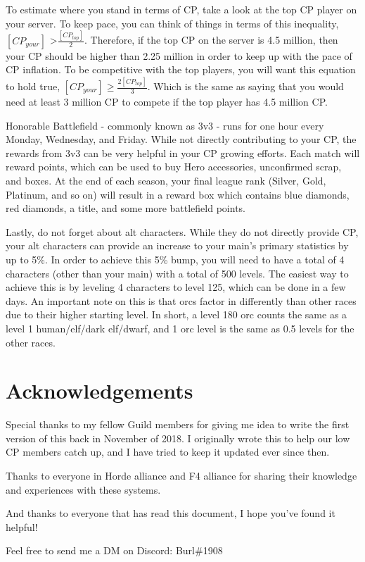 \documentclass[]{article}
\begin{document}
To estimate where you stand in terms of CP, take a look at the top CP player on your server.
To keep pace, you can think of things in terms of this inequality, $[CP_{your}]$ \textgreater $\frac{[CP_{top}]}{2}$. Therefore, if the top CP on the server is 4.5 million, then your CP should be higher than 2.25 million in order to keep up with the pace of CP inflation. To be competitive with the top players, you will want this equation to hold true, $[CP_{your}] \geq \frac{2[CP_{top}]}{3}$. Which is the same as saying that you would need at least 3 million CP to compete if the top player has 4.5 million CP.

Honorable Battlefield - commonly known as 3v3 - runs for one hour every Monday, Wednesday, and Friday.
While not directly contributing to your CP, the rewards from 3v3 can be very helpful in your CP growing efforts.
Each match will reward points, which can be used to buy Hero accessories, unconfirmed scrap, and boxes.
At the end of each season, your final league rank (Silver, Gold, Platinum, and so on) will result in a reward box which contains blue diamonds, red diamonds, a title, and some more battlefield points.

Lastly, do not forget about alt characters.
While they do not directly provide CP, your alt characters can provide an increase to your main's primary statistics by up to 5\%. 
In order to achieve this 5\% bump, you will need to have a total of 4 characters (other than your main) with a total of 500 levels.
The easiest way to achieve this is by leveling 4 characters to level 125, which can be done in a few days.
An important note on this is that orcs factor in differently than other races due to their higher starting level.
In short, a level 180 orc counts the same as a level 1 human/elf/dark elf/dwarf, and 1 orc level is the same as 0.5 levels for the other races.
\pagebreak

\section*{Acknowledgements}
Special thanks to my fellow Guild members for giving me idea to write the first version of this back in November of 2018.
I originally wrote this to help our low CP members catch up, and I have tried to keep it updated ever since then.

Thanks to everyone in Horde alliance and F4 alliance for sharing their knowledge and experiences with these systems.

And thanks to everyone that has read this document, I hope you've found it helpful!

Feel free to send me a DM on Discord: Burl\#1908

\nocite{*}


\end{document}
